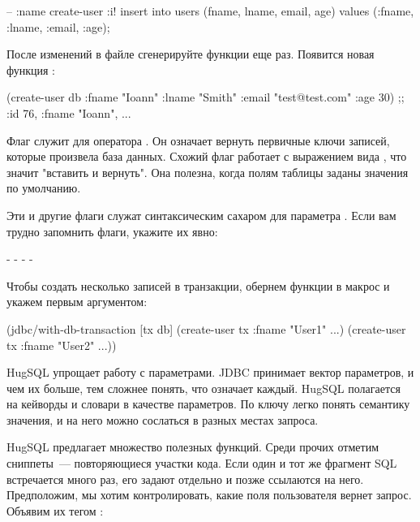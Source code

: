\begin{english}
  \begin{sql}
-- :name create-user :i!
insert into users (fname, lname, email, age)
values (:fname, :lname, :email, :age);
  \end{sql}
\end{english}

После изменений в файле сгенерируйте функции еще раз. Появится новая функция :

\begin{english}
  \begin{clojure}
(create-user db {:fname "Ioann"
                 :lname "Smith"
                 :email "test@test.com"
                 :age 30})
;; {:id 76, :fname "Ioann", ...}
  \end{clojure}
\end{english}

Флаг  служит для оператора . Он означает вернуть первичные ключи записей, которые произвела база данных. Схожий флаг \code{:<!} работает с выражением вида , что значит "вставить и вернуть". Она полезна, когда полям таблицы заданы значения по умолчанию.

Эти и другие флаги служат синтаксическим сахаром для параметра . Если вам трудно запомнить флаги, укажите их явно:

- 
- 
- 
- 

Чтобы создать несколько записей в транзакции, обернем функции в макрос  и укажем  первым аргументом:

\begin{english}
  \begin{clojure}
(jdbc/with-db-transaction [tx db]
  (create-user tx {:fname "User1" ...})
  (create-user tx {:fname "User2" ...}))
  \end{clojure}
\end{english}

HugSQL упрощает работу с параметрами. JDBC принимает вектор параметров, и чем их больше, тем сложнее понять, что означает каждый. HugSQL полагается на кейворды и словари в качестве параметров. По ключу легко понять семантику значения, и на него можно сослаться в разных местах запроса.

HugSQL предлагает множество полезных функций. Среди прочих отметим сниппеты~--- повторяющиеся участки кода. Если один и тот же фрагмент SQL встречается много раз, его задают отдельно и позже ссылаются на него. Предположим, мы хотим контролировать, какие поля пользователя вернет запрос. Объявим их тегом :

